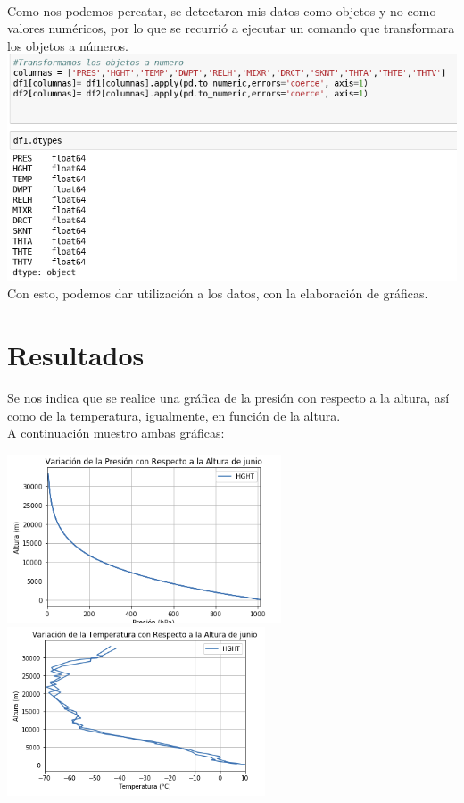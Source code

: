\documentclass{article}
\begin{document}
\begin{doublespace}
\\
Como nos podemos percatar, se detectaron mis datos como objetos y no como valores numéricos, por lo que se recurrió a ejecutar un comando que transformara los objetos a números.
\\
\includegraphics[scale=0.5]{act33.png}
\\
Con esto, podemos dar utilización a los datos, con la elaboración de gráficas.

\section{Resultados}
Se nos indica que se realice una gráfica de la presión con respecto a la altura, así como de la temperatura, igualmente, en función de la altura.
\\
A continuación muestro ambas gráficas:

	\includegraphics[height=5cm]{act35.png}  \hspace*{\fill}
    \includegraphics[height=5cm]{act37.png}
\\
\begin{itemize}



\end{itemize}
\end{doublespace}
\end{document}
